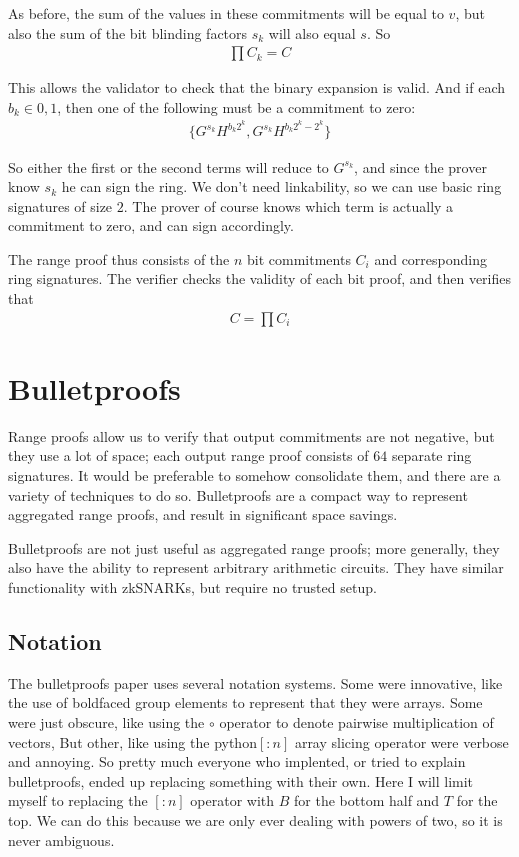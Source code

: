\documentclass{article}
\begin{document}
As before, the sum of the values in these commitments will be equal to $v$, but also the sum of the bit blinding factors $s_k$ will also equal $s$.  So
\begin{align}
  \prod{C_k} = C
\end{align}

This allows the validator to check that the binary expansion is valid.  And if each $b_k \in {0, 1}$, then one of the following must be a commitment to zero:
\begin{align}
  \{G^{s_k} H^{b_k 2^k}, G^{s_k} H^{b_k 2^k - 2^k}\}
\end{align}

So either the first or the second terms will reduce to $G^{s_k}$, and since the prover know $s_k$ he can sign the ring.  We don't need linkability, so we can use basic ring signatures of size $2$. The prover of course knows which term is actually a commitment to zero, and can sign accordingly.

The range proof thus consists of the $n$ bit commitments $C_i$ and corresponding ring signatures.  The verifier checks the validity of each bit proof, and then verifies that
\begin{align}
  C = \prod{C_i}
\end{align}



\section{Bulletproofs}

Range proofs allow us to verify that output commitments are not negative, but they use a lot of space; each output range proof consists of $64$ separate ring signatures.  It would be preferable to somehow consolidate them, and there are a variety of techniques to do so.  Bulletproofs \cite{bulletproofs} are a compact way to represent aggregated range proofs, and result in significant space savings.

Bulletproofs are not just useful as aggregated range proofs; more generally, they also have the ability to represent arbitrary arithmetic circuits.  They have similar functionality with zkSNARKs, but require no trusted setup.

\subsection{Notation}

The bulletproofs paper uses several notation systems.  Some were innovative, like the use of boldfaced group elements to represent that they were arrays.  Some were just obscure, like using the $\circ$ operator to denote pairwise multiplication of vectors,  But other, like using the python$[:n]$ array slicing operator were verbose and annoying.  So pretty much everyone who implented, or tried to explain bulletproofs, ended up replacing something with their own.  Here I will limit myself to replacing the $[:n]$ operator with $B$ for the bottom half and $T$ for the top.  We can do this because we are only ever dealing with powers of two, so it is never ambiguous.
\end{document}
